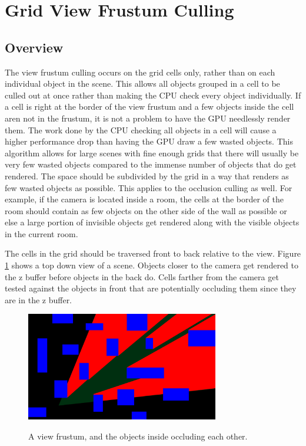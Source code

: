 \documentclass[12pt]{ucthesis}
\newcommand{\captionfonts}{\small\bf\ssp}
\begin{document}
\section{Grid View Frustum Culling}
\label{grid-view-frustum-culling}

\subsection{Overview}
\label{Overview}
The view frustum culling occurs on the grid cells only, rather than on each individual object in the scene.
This allows all objects grouped in a cell to be culled out at once rather than making the CPU check every object individually.
If a cell is right at the border of the view frustum and a few objects inside the cell aren not in the frustum, it is not a problem to have the GPU needlessly render them.
The work done by the CPU checking all objects in a cell will cause a higher performance drop than having the GPU draw a few wasted objects.
This algorithm allows for large scenes with fine enough grids that there will usually be very few wasted objects compared to the immense number of objects that do get rendered.
The space should be subdivided by the grid in a way that renders as few wasted objects as possible.
This applies to the occlusion culling as well.
For example, if the camera is located inside a room, the cells at the border of the room should contain as few objects on the other side of the wall as possible or else a large portion of invisible objects get rendered along with the visible objects in the current room.

The cells in the grid should be traversed front to back relative to the view.
Figure \ref{fig:vf-and-occluders} shows a top down view of a scene.
Objects closer to the camera get rendered to the z buffer before objects in the back do.
Cells farther from the camera get tested against the objects in front that are potentially occluding them since they are in the z buffer.

\begin{figure}
\begin{center}
\includegraphics[width=0.75\textwidth]{Images/frustFigure.png}
\captionfonts
\caption[View Frustum and Occluders]{A view frustum, and the objects inside occluding each other.}
\label{fig:vf-and-occluders}
\end{center}
\end{figure}
\end{document}
